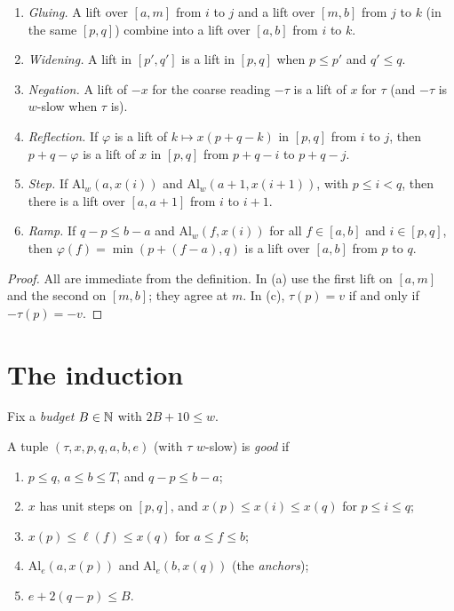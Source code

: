 \begin{lemma}\label{lem:lift-ops}
\begin{enumerate}[label=(\alph*)]
\item \emph{Gluing.} A lift over $[a,m]$ from $i$ to $j$ and a lift over $[m,b]$ from $j$ to $k$ (in the same
$[p,q]$) combine into a lift over $[a,b]$ from $i$ to $k$.
\item \emph{Widening.} A lift in $[p',q']$ is a lift in $[p,q]$ when $p\le p'$ and $q'\le q$.
\item \emph{Negation.} A lift of $-x$ for the coarse reading $-\tau$ is a lift of $x$ for $\tau$ (and $-\tau$ is
$w$-slow when $\tau$ is).
\item \emph{Reflection.} If $\varphi$ is a lift of $k\mapsto x(p+q-k)$ in $[p,q]$ from $i$ to $j$, then
$p+q-\varphi$ is a lift of $x$ in $[p,q]$ from $p+q-i$ to $p+q-j$.
\item \emph{Step.} If $\mathrm{Al}_w(a,x(i))$ and $\mathrm{Al}_w(a+1,x(i+1))$, with $p\le i<q$, then there is a lift
over $[a,a+1]$ from $i$ to $i+1$.
\item \emph{Ramp.} If $q-p\le b-a$ and $\mathrm{Al}_w(f,x(i))$ for all $f\in[a,b]$ and $i\in[p,q]$, then
$\varphi(f)=\min(p+(f-a),q)$ is a lift over $[a,b]$ from $p$ to $q$.
\end{enumerate}
\end{lemma}

\begin{proof}
All are immediate from the definition. In (a) use the first lift on $[a,m]$ and the second on $[m,b]$; they agree at
$m$. In (c), $\tau(p)=v$ if and only if $-\tau(p)=-v$.
\end{proof}


\section{The induction}\label{sec:pf-induction}

Fix a \emph{budget} $B\in\mathbb{N}$ with $2B+10\le w$.

\begin{definition}\label{def:good}
A tuple $(\tau,x,p,q,a,b,e)$ (with $\tau$ $w$-slow) is \emph{good} if
\begin{enumerate}[label=(G\arabic*)]
\item\label{G:order} $p\le q$, $a\le b\le T$, and $q-p\le b-a$;
\item\label{G:x} $x$ has unit steps on $[p,q]$, and $x(p)\le x(i)\le x(q)$ for $p\le i\le q$;
\item\label{G:read} $x(p)\le\ell(f)\le x(q)$ for $a\le f\le b$;
\item\label{G:anchor} $\mathrm{Al}_e(a,x(p))$ and $\mathrm{Al}_e(b,x(q))$ (the \emph{anchors});
\item\label{G:budget} $e+2(q-p)\le B$.
\end{enumerate}
\end{definition}


